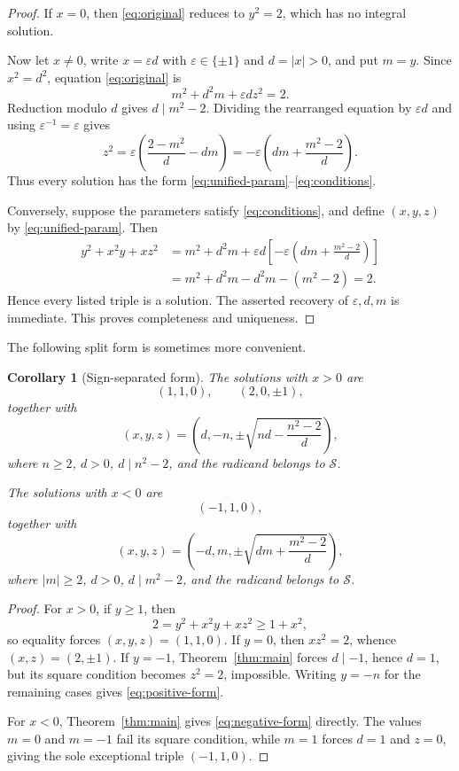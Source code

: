 \documentclass[11pt]{article}
\newtheorem{corollary}[theorem]{Corollary}
\theoremstyle{remark}
\newcommand{\Sq}{\mathcal S}
\begin{document}
\begin{proof}
If $x=0$, then \eqref{eq:original} reduces to $y^2=2$, which has no integral solution.

Now let $x\ne0$, write $x=\varepsilon d$ with $\varepsilon\in\{\pm1\}$ and $d=|x|>0$, and put $m=y$.  Since $x^2=d^2$, equation \eqref{eq:original} is
\[
 m^2+d^2m+\varepsilon d z^2=2.
\]
Reduction modulo $d$ gives $d\mid m^2-2$.  Dividing the rearranged equation by $\varepsilon d$ and using $\varepsilon^{-1}=\varepsilon$ gives
\[
 z^2
 =\varepsilon\left(\frac{2-m^2}{d}-dm\right)
 =-\varepsilon\left(dm+\frac{m^2-2}{d}\right).
\]
Thus every solution has the form \eqref{eq:unified-param}--\eqref{eq:conditions}.

Conversely, suppose the parameters satisfy \eqref{eq:conditions}, and define $(x,y,z)$ by \eqref{eq:unified-param}.  Then
\[
\begin{aligned}
 y^2+x^2y+xz^2
 &=m^2+d^2m+\varepsilon d
   \left[-\varepsilon\left(dm+\frac{m^2-2}{d}\right)\right]\\
 &=m^2+d^2m-d^2m-(m^2-2)=2.
\end{aligned}
\]
Hence every listed triple is a solution.  The asserted recovery of $\varepsilon,d,m$ is immediate.  This proves completeness and uniqueness.
\end{proof}

The following split form is sometimes more convenient.

\begin{corollary}[Sign-separated form]\label{cor:split}
The solutions with $x>0$ are
\[
 (1,1,0),\qquad (2,0,\pm1),
\]
together with
\begin{equation}\label{eq:positive-form}
 (x,y,z)=
 \left(
 d,-n,\pm\sqrt{nd-\frac{n^2-2}{d}}
 \right),
\end{equation}
where $n\ge2$, $d>0$, $d\mid n^2-2$, and the radicand belongs to $\Sq$.

The solutions with $x<0$ are
\[
 (-1,1,0),
\]
together with
\begin{equation}\label{eq:negative-form}
 (x,y,z)=
 \left(
 -d,m,\pm\sqrt{dm+\frac{m^2-2}{d}}
 \right),
\end{equation}
where $|m|\ge2$, $d>0$, $d\mid m^2-2$, and the radicand belongs to $\Sq$.
\end{corollary}

\begin{proof}
For $x>0$, if $y\ge1$, then
\[
 2=y^2+x^2y+xz^2\ge1+x^2,
\]
so equality forces $(x,y,z)=(1,1,0)$.  If $y=0$, then $xz^2=2$, whence $(x,z)=(2,\pm1)$.  If $y=-1$, Theorem~\ref{thm:main} forces $d\mid-1$, hence $d=1$, but its square condition becomes $z^2=2$, impossible.  Writing $y=-n$ for the remaining cases gives \eqref{eq:positive-form}.

For $x<0$, Theorem~\ref{thm:main} gives \eqref{eq:negative-form} directly.  The values $m=0$ and $m=-1$ fail its square condition, while $m=1$ forces $d=1$ and $z=0$, giving the sole exceptional triple $(-1,1,0)$.
\end{proof}
\end{document}
